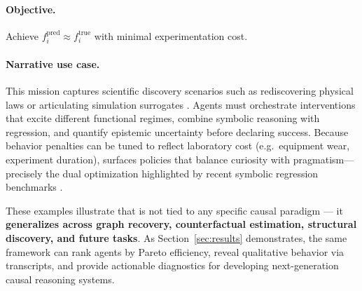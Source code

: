 \paragraph{Objective.} Achieve $f_i^\text{pred} \approx f_i^\text{true}$ with minimal experimentation cost.

\paragraph{Narrative use case.}
This mission captures scientific discovery scenarios such as rediscovering physical laws or articulating simulation surrogates \citep{olson2017pmlb,la2021contemporary,romano2021pmlb}. Agents must orchestrate interventions that excite different functional regimes, combine symbolic reasoning with regression, and quantify epistemic uncertainty before declaring success. Because behavior penalties can be tuned to reflect laboratory cost (e.g.\ equipment wear, experiment duration), \game surfaces policies that balance curiosity with pragmatism—precisely the dual optimization highlighted by recent symbolic regression benchmarks \citep{Shojaee2023TransformerbasedPFA,Valipour2021SymbolicGPTAGA}.

\medskip
These examples illustrate that \game is not tied to any specific causal paradigm — it \textbf{generalizes across graph recovery, counterfactual estimation, structural discovery, and future tasks}. As Section~\ref{sec:results} demonstrates, the same framework can rank agents by Pareto efficiency, reveal qualitative behavior via transcripts, and provide actionable diagnostics for developing next-generation causal reasoning systems.
